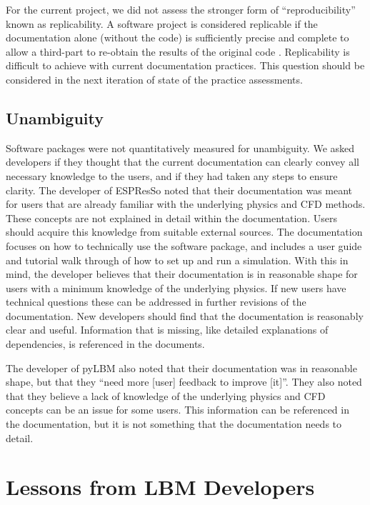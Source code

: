 \documentclass[final, 3p, times, authoryear]{elsarticle}
\begin{document}
For the current project, we did not assess the stronger form of
``reproducibility'' known as replicability.  A software project is considered
replicable if the documentation alone (without the code) is sufficiently precise
and complete to allow a third-part to re-obtain the results of the original code
\citep{BenureauAndRougier2017}.  Replicability is difficult to achieve with
current documentation practices.  This question should be considered in the next
iteration of state of the practice assessments. 

\subsection{Unambiguity}

Software packages were not quantitatively measured for unambiguity. We asked
developers if they thought that the current documentation can clearly convey all
necessary knowledge to the users, and if they had taken any steps to ensure
clarity. The developer of ESPResSo noted that their documentation was meant for
users that are already familiar with the underlying physics and CFD methods.
These concepts are not explained in detail within the documentation. Users
should acquire this knowledge from suitable external sources. The documentation
focuses on how to technically use the software package, and includes a user
guide and tutorial walk through of how to set up and run a simulation. With this
in mind, the developer believes that their documentation is in reasonable shape
for users with a minimum knowledge of the underlying physics. If new users have
technical questions these can be addressed in further revisions of the
documentation. New developers should find that the documentation is reasonably
clear and useful. Information that is missing, like detailed explanations of
dependencies, is referenced in the documents. 

The developer of pyLBM also noted that their documentation was in reasonable
shape, but that they ``need more [user] feedback to improve [it]''. They also
noted that they believe a lack of knowledge of the underlying physics and CFD
concepts can be an issue for some users. This information can be referenced in
the documentation, but it is not something that the documentation needs to
detail. 

\section{Lessons from LBM Developers} \label{Sec_AddressConcerns}
\end{document}
